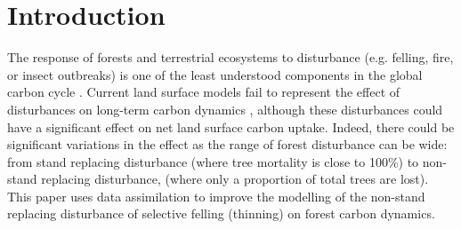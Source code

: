 \documentclass[draft,linenumbers]{agujournal}
\begin{document}
%
% 
% 
% 


\section{Introduction}

The response of forests and terrestrial ecosystems to disturbance (e.g. felling, fire, or insect outbreaks) is one of the least understood components in the global carbon cycle \citep{ciais2014carbon}. Current land surface models fail to represent the effect of disturbances on long-term carbon dynamics \citep{running2008ecosystem}, although these disturbances could have a significant effect on net land surface carbon uptake. Indeed, there could be significant variations in the effect as the range of forest disturbance can be wide: from stand replacing disturbance (where tree mortality is close to 100\%) to non-stand replacing disturbance, (where only a proportion of total trees are lost). This paper uses data assimilation to improve the modelling of the non-stand replacing disturbance of selective felling (thinning) on forest carbon dynamics.
\end{document}
